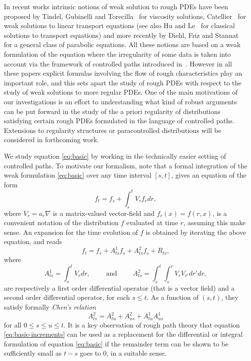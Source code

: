 \documentclass[11pt,a4paper]{amsart}
\renewcommand{\leq}{\leqslant}
\theoremstyle{plain}%
\theoremstyle{definition}
\theoremstyle{remark}
\numberwithin{equation}{section} %
\begin{document}
\smallskip

In recent works intrinsic notions of weak solution to rough PDEs have been proposed by Tindel, Gubinelli and Torecilla~\cite{GTT} for viscosity solutions,  Catellier~\cite{CatellierTransport} for weak solutions to linear transport equations (see also Hu and Le~\cite{HuLe} for classical solutions to transport equations) and more recently by Diehl, Friz and Stannat~\cite{DiehlFrizStannat} for a general class of parabolic equations. All these notions are based on a weak formulation of the equation where the irregularity of some data is taken into account via the framework of controlled paths introduced in~\cite{Gubinelli04}. However in all these papers explicit formulas involving the flow of rough characteristics play an important role, and this sets apart the study of rough PDEs with respect to the study of weak solutions to more regular PDEs. One of the main motivations of our investigations is an effort to understanding what kind of robust arguments can be put forward in the study of the a priori regularity of distributions satisfying certain rough PDEs formulated in the language of controlled paths. Extensions to regularity structures or paracontrolled distributions will be considered in forthcoming work. 

\bigskip

We study equation \eqref{eq:basic} by working in the technically easier setting of controlled paths. To motivate our formalism, note that a formal integration of the weak formulation \eqref{eq:basic} over any time interval $[s,t]$, gives an equation of the form
$$
f_t = f_s + \int_s^t V_r f_r dr, 
$$ 
where $V_r = a_r\nabla$ is a matrix-valued vector-field and $f_r(x) = f(r,x)$, is a convenient notation of the distribution $f$ evaluated at time $r$, assuming this make sense. An expansion for the time evolution of $f$ is obtained by iterating the above equation, and reads
\begin{equation}
\label{eq:basic-increments}
f_t = f_s + A^1_{ts} f_s + A^2_{ts} f_s + R_{ts},
\end{equation}
where
$$
A^1_{ts} = \int_s^t V_r  dr,\qquad\textrm{ and }\qquad A^2_{ts} = \int_s^t \int_s^r V_r V_{r'} dr' dr,
$$
are respectively a first order differential operator (that is a vector field) and a second order differential operator, for each $s\leq t$. As a function of $(s,t)$, they satisfy formally \textit{Chen's relation}
\begin{equation}
\label{eq:operator-chen}
A^2_{ts} =A^2_{tu}+ A^2_{us} + A^{1}_{tu}A^{1}_{us}
\end{equation}
for all $0\leq s \leq u \leq t$. It is a key observation of rough path theory that equation \eqref{eq:basic-increments} can be used as a replacement for the differential or integral formulation 
of equation \eqref{eq:basic} if the remainder term can be shown to be sufficiently small as $t-s$ goes to $0$, in a suitable sense.
\end{document}
